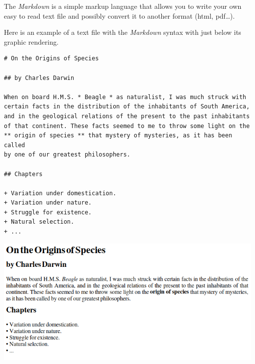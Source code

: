\documentclass[11pt,class=report,crop=false]{standalone}
\begin{document}

\begin{cours}[Markdown]
The \emph{Markdown} is a simple markup language that allows you to write your own easy to read text file and possibly convert it to another format (html, pdf\ldots).

Here is an example of a text file with the \emph{Markdown} syntax with just below its graphic rendering.
\begin{center}
\footnotesize
\begin{minipage}{0.7\textwidth}
\begin{verbatim}
# On the Origins of Species

## by Charles Darwin

When on board H.M.S. * Beagle * as naturalist, I was much struck with 
certain facts in the distribution of the inhabitants of South America, 
and in the geological relations of the present to the past inhabitants 
of that continent. These facts seemed to me to throw some light on the 
** origin of species ** that mystery of mysteries, as it has been called 
by one of our greatest philosophers.

## Chapters

+ Variation under domestication.
+ Variation under nature.
+ Struggle for existence.
+ Natural selection. 
+ ...
\end{verbatim}
\end{minipage}
\end{center}
\begin{center}
\includegraphics[scale=0.6]{screen-markdown-1-en}
\end{center}



\end{cours}
\end{document}
